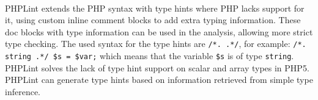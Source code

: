 \documentclass[../main.tex]{subfiles}
\begin{document}
    \paragraph{}
    PHPLint\footnotemark{} extends the PHP syntax with type hints where PHP lacks support for it, using custom inline comment blocks to add extra typing information.
    These doc blocks with type information can be used in the analysis, allowing more strict type checking.
    The used syntax for the type hints are \texttt{/*. .*/}, for example: \texttt{/*. string .*/ \$s = \$var;} which means that the variable \texttt{\$s} is of type \texttt{string}.
    PHPLint solves the lack of type hint support on scalar and array types in PHP5.
    PHPLint can generate type hints based on information retrieved from simple type inference.
\end{document}
